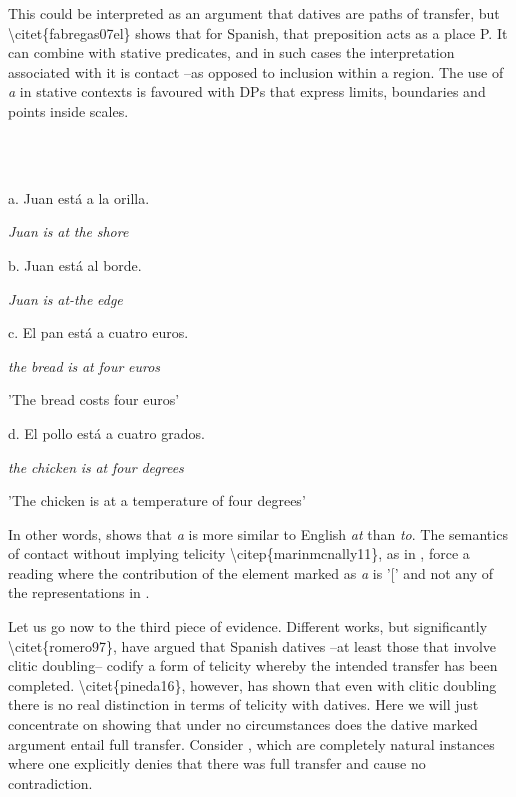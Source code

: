 \documentclass[output=paper,modfonts,nonflat]{langsci/langscibook}
\begin{document}
This could be interpreted as an argument that datives are paths of transfer, but {\textbackslash}citet\{fabregas07el\} shows that for Spanish, that preposition acts as a place P. It can combine with stative predicates, and in such cases the interpretation associated with it is contact –as opposed to inclusion within a region. The use of \textit{a} in stative contexts is favoured with DPs that express limits, boundaries and points inside scales.

\ea%
    \label{ex:key:22}
    \gll\\
        \\
    \glt
    \z

          a. Juan está a   la    orilla.

        \textit{Juan} \textit{is}    \textit{at} \textit{the} \textit{shore}

    b. Juan está al      borde.

        \textit{Juan} \textit{is}    \textit{at-the} \textit{edge}

    c. El   pan    está   a  cuatro   euros.

        \textit{the} \textit{bread} \textit{is}   \textit{at} \textit{four}    \textit{euros}

    {}'The bread costs four euros'  

    d. El   pollo     está a cuatro grados.

        \textit{the}  \textit{chicken}   \textit{is}    \textit{at} \textit{four}     \textit{degrees}

    {}'The chicken is at a temperature of four degrees'

In other words,  shows that \textit{a} is more similar to English \textit{at} than \textit{to}. The semantics of contact without implying telicity {\textbackslash}citep\{marinmcnally11\}, as in , force a reading where the contribution of the element marked as \textit{a} is '[' and not any of the representations in . 

Let us go now to the third piece of evidence. Different works, but significantly {\textbackslash}citet\{romero97\}, have argued that Spanish datives –at least those that involve clitic doubling– codify a form of telicity whereby the intended transfer has been completed. {\textbackslash}citet\{pineda16\}, however, has shown that even with clitic doubling there is no real distinction in terms of telicity with datives. Here we will just concentrate on showing that under no circumstances does the dative marked argument entail full transfer. Consider , which are completely natural instances where one explicitly denies that there was full transfer and cause no contradiction. 
\end{document}
